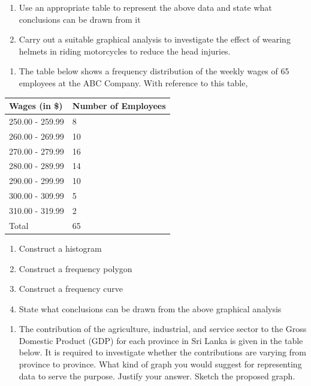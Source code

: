 \documentclass[]{book}
\providecommand{\tightlist}{%
  \setlength{\itemsep}{0pt}\setlength{\parskip}{0pt}}
\begin{document}
\begin{enumerate}
\def\labelenumi{\alph{enumi})}
\item
  Use an appropriate table to represent the above data and state what conclusions can be drawn from it
\item
  Carry out a suitable graphical analysis to investigate the effect of wearing helmets in riding motorcycles to reduce the head injuries.
\end{enumerate}

\begin{enumerate}
\def\labelenumi{\arabic{enumi}.}
\setcounter{enumi}{7}
\tightlist
\item
  The table below shows a frequency distribution of the weekly wages of 65 employees at the ABC Company. With reference to this table,
\end{enumerate}

\begin{longtable}[]{@{}ll@{}}
\toprule
Wages (in \$) & Number of Employees\tabularnewline
\midrule
\endhead
250.00 - 259.99 & 8\tabularnewline
260.00 - 269.99 & 10\tabularnewline
270.00 - 279.99 & 16\tabularnewline
280.00 - 289.99 & 14\tabularnewline
290.00 - 299.99 & 10\tabularnewline
300.00 - 309.99 & 5\tabularnewline
310.00 - 319.99 & 2\tabularnewline
Total & 65\tabularnewline
\bottomrule
\end{longtable}

\begin{enumerate}
\def\labelenumi{\alph{enumi})}
\tightlist
\item
  Construct a histogram
\item
  Construct a frequency polygon
\item
  Construct a frequency curve
\item
  State what conclusions can be drawn from the above graphical analysis
\end{enumerate}

\begin{enumerate}
\def\labelenumi{\arabic{enumi}.}
\setcounter{enumi}{8}
\tightlist
\item
  The contribution of the agriculture, industrial, and service sector to the Gross Domestic Product (GDP) for each province in Sri Lanka is given in the table below. It is required to investigate whether the contributions are varying from province to province. What kind of graph you would suggest for representing data to serve the purpose. Justify your answer. Sketch the proposed graph.
\end{enumerate}
\end{document}
